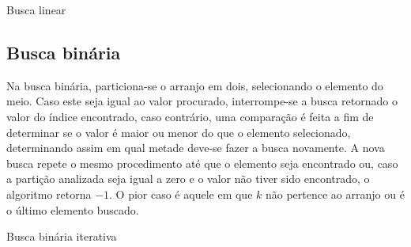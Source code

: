\begin{algorithm}[H]
  \DontPrintSemicolon
  \SetAlgoLined
  \caption{Busca linear}

  \BlankLine

\end{algorithm}



\subsection{Busca binária}

Na busca binária, particiona-se o arranjo em dois, selecionando o elemento do meio. Caso este seja igual ao valor procurado, interrompe-se a busca retornado o valor do índice encontrado, caso contrário, uma comparação é feita a fim de determinar se o valor é maior ou menor do que o elemento selecionado, determinando assim em qual metade deve-se fazer a busca novamente. A nova busca repete o mesmo procedimento até que o elemento seja encontrado ou, caso a partição analizada seja igual a zero e o valor não tiver sido encontrado, o algoritmo retorna $-1$. O pior caso é aquele em que $k$ não pertence ao arranjo ou é o último elemento buscado.

\begin{algorithm}[H]
  \DontPrintSemicolon
  \SetAlgoLined
  \caption{Busca binária iterativa}

  \BlankLine

\end{algorithm}


